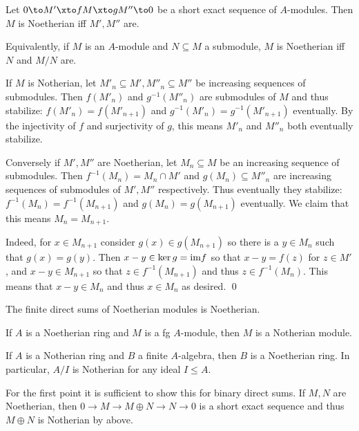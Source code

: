 \blemm

    Let $0\to M'\xto fM\xto gM''\to0$ be a short exact sequence of $A$-modules.
    Then $M$ is Noetherian iff $M',M''$ are.

    Equivalently, if $M$ is an $A$-module and $N\subseteq M$ a submodule, $M$ is Noetherian iff $N$ and $M/N$ are.

\elemm

\bproof

    If $M$ is Notherian, let $M'_n\subseteq M',M''_n\subseteq M''$ be increasing sequences of submodules.
    Then $f(M'_n)$ and $g^{-1}(M''_n)$ are submodules of $M$ and thus stabilize: $f(M'_n)=f(M'_{n+1})$ and $g^{-1}(M'_n)=g^{-1}(M'_{n+1})$ eventually.
    By the injectivity of $f$ and surjectivity of $g$, this means $M'_n$ and $M''_n$ both eventually stabilize.

    Conversely if $M',M''$ are Noetherian, let $M_n\subseteq M$ be an increasing sequence of submodules.
    Then $f^{-1}(M_n)=M_n\cap M'$ and $g(M_n)\subseteq M''_n$ are increasing sequences of submodules of $M',M''$ respectively.
    Thus eventually they stabilize: $f^{-1}(M_n)=f^{-1}(M_{n+1})$ and $g(M_n)=g(M_{n+1})$ eventually.
    We claim that this means $M_n=M_{n+1}$.

    Indeed, for $x\in M_{n+1}$ consider $g(x)\in g(M_{n+1})$ so there is a $y\in M_n$ such that $g(x)=g(y)$.
    Then $x-y\in\mathop{\rm ker} g={\rm im} f$ so that $x-y=f(z)$ for $z\in M'$, and $x-y\in M_{n+1}$ so that $z\in f^{-1}(M_{n+1})$ and thus $z\in f^{-1}(M_n)$.
    This means that $x-y\in M_n$ and thus $x\in M_n$ as desired.
    \qed

\eproof

\bcoro

    \benum
        \item The finite direct sums of Noetherian modules is Noetherian.
        \item If $A$ is a Noetherian ring and $M$ is a fg $A$-module, then $M$ is a Notherian module.
        \item If $A$ is a Notherian ring and $B$ a finite $A$-algebra, then $B$ is a Noetherian ring.
        In particular, $A/I$ is Notherian for any ideal $I\leq A$.
    \eenum

\ecoro

\bproof

    For the first point it is sufficient to show this for binary direct sums.
    If $M,N$ are Noetherian, then $0\to M\to M\oplus N\to N\to0$ is a short exact sequence and thus $M\oplus N$ is Notherian by above.

